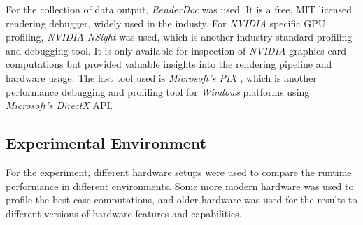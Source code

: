 \noindent
For the collection of data output, \emph{RenderDoc} \cite{RenderDoc} was used. It is a free, MIT licensed 
rendering debugger, widely used in the industy. For \emph{NVIDIA} specific \ac{GPU} profiling, \emph{NVIDIA NSight} 
\cite{NSight} was used, which is another industry standard profiling and debugging tool. It is only available for 
inspection of \emph{NVIDIA} graphics card computations but provided valuable insights into the rendering pipeline 
and hardware usage. The last tool used is \emph{Microsoft's PIX} \cite{PIX}, which is another performance debugging 
and profiling tool for \emph{Windows} platforms using \emph{Microsoft's DirectX} \ac{API}.


\subsection*{Experimental Environment} \label{sec-experimental-environment}

For the experiment, different hardware setups were used to compare the runtime performance in different environments.
Some more modern hardware was used to profile the best case computations, and older hardware was used for the results 
to different versions of hardware features and capabilities.

